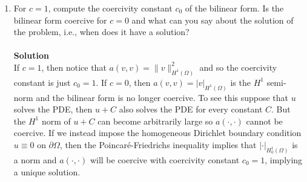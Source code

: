 \documentclass[11pt]{article}
\begin{document}
\begin{enumerate}
\begin{enumerate}
    \item For $c=1$, compute the coercivity constant $c_0$ of the
      bilinear form. Is the bilinear form coercive for $c=0$ and what
      can you say about the solution of the problem, i.e., when does it
      have a solution?\\
\\
{\bf Solution}\\
If $c = 1$, then notice that $a(v,v) = \|v\|_{H^1(\Omega)}^2$ and so the coercivity constant is just $c_0 = 1$.  If $c = 0$, then $a(v,v) = |v|_{H^1(\Omega)}$ is the $H^1$ semi-norm and the bilinear form is no longer coercive.  To see this suppose that $u$ solves the PDE, then $u + C$ also solves the PDE for every constant $C$.  But the $H^1$ norm of $u + C$ can become arbitrarily large so $a(\cdot, \cdot)$ cannot be coercive.  If we instead impose the homogeneous Dirichlet boundary condition $u \equiv 0$ on $\partial \Omega$, then the Poincar{\'e}-Friedrichs inequality implies that $|\cdot|_{H_0^1(\Omega)}$ is a norm and $a(\cdot, \cdot)$ will be coercive with coercivity constant $c_0 = 1$, implying a unique solution.








\end{enumerate}
\end{enumerate}
\end{document}

